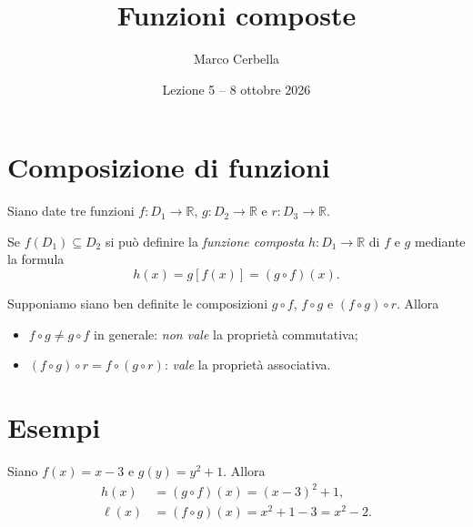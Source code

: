 \documentclass[11pt,a4paper]{article}
\title{Funzioni composte}
\author{Marco Cerbella}
\date{Lezione 5 -- 8 ottobre 2026}
\begin{document}
\maketitle

\section{Composizione di funzioni}

Siano date tre funzioni $f : D_1 \to \mathbb{R}$, $g : D_2 \to \mathbb{R}$ e $r : D_3 \to \mathbb{R}$.

\begin{definizione}
Se $f(D_1) \subseteq D_2$ si può definire la \emph{funzione composta} $h : D_1 \to \mathbb{R}$ di $f$ e $g$ mediante la formula
\[
h(x) = g[f(x)] = (g \circ f)(x).
\]
\end{definizione}

Supponiamo siano ben definite le composizioni $g \circ f$, $f \circ g$ e $(f \circ g) \circ r$. Allora
\begin{itemize}
    \item $f \circ g \neq g \circ f$ in generale: \emph{non vale} la proprietà commutativa;
    \item $(f \circ g) \circ r = f \circ (g \circ r)$: \emph{vale} la proprietà associativa.
\end{itemize}

\section{Esempi}

\begin{esempio}
Siano $f(x) = x - 3$ e $g(y) = y^2 + 1$. Allora
\begin{align*}
h(x) &= (g \circ f)(x) = (x - 3)^2 + 1, \\
\ell(x) &= (f \circ g)(x) = x^2 + 1 - 3 = x^2 - 2.
\end{align*}
\end{esempio}
\end{document}
